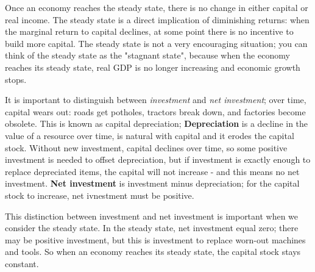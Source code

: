 \documentclass[11pt]{article} %
\begin{document}
Once an economy reaches the steady state, there is no change in either capital or real income. The steady state is a direct implication of diminishing returns: when the marginal return to capital declines, at some point there is no incentive to build more capital. The steady state is not a very encouraging situation; you can think of the steady state as the "stagnant state", because when the economy reaches its steady state, real GDP is no longer increasing and economic growth stops.

It is important to distinguish between \textit{investment} and \textit{net investment}; over time, capital wears out: roads get potholes, tractors break down, and factories become obsolete. This is known as capital depreciation; \textbf{Depreciation} is a decline in the value of a resource over time, is natural with capital and it erodes the capital stock. Without new investment, capital declines over time, so some positive investment is needed to offset depreciation, but if investment is exactly enough to replace depreciated items, the capital will not increase - and this means no net investment. \textbf{Net investment} is investment minus depreciation; for the capital stock to increase, net ivnestment must be positive.

This distinction between investment and net investment is important when we consider the steady state. In the steady state, net investment equal zero; there may be positive investment, but this is investment to replace worn-out machines and tools. So when an economy reaches its steady state, the capital stock stays constant.
\end{document}
